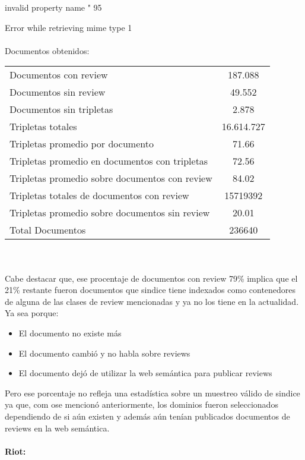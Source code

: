 \noindent invalid property name " 95

\noindent Error while retrieving mime type 1
\\ 
\\ 
Documentos obtenidos:

\begin{tabular}{| l | c | }\hline
Documentos con review & 187.088 \\
Documentos sin review & 49.552\\
Documentos sin tripletas & 2.878\\
Tripletas totales & 16.614.727\\
Tripletas promedio por documento & 71.66\\
Tripletas promedio en documentos con tripletas & 72.56\\
Tripletas promedio sobre documentos con review & 84.02\\
Tripletas totales de documentos con review & 15719392\\
Tripletas promedio sobre documentos sin review & 20.01\\\hline
Total Documentos & 236640\\\hline
\end{tabular}
\\ \\
Cabe destacar que, ese procentaje de documentos con review 79\% implica que el 21\% restante fueron documentos que sindice tiene indexados como contenedores de 
alguna de las clases de review mencionadas y ya no los tiene en la actualidad. Ya sea porque:
\begin{itemize}
\item El documento no existe más
\item El documento cambió y no habla sobre reviews
\item El documento dejó de utilizar la web semántica para publicar reviews
\end{itemize}
Pero ese porcentaje no refleja una estadística sobre un muestreo válido de sindice ya que, com ose mencionó anteriormente, los dominios fueron seleccionados 
dependiendo de si aún existen y además aún tenían publicados documentos de reviews en la web semántica.
\\
\\
\textbf{Riot:}

